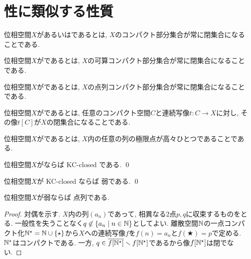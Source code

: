 \documentclass[uplatex, dvipdfmx, a4paper, 12pt, class=jsbook, crop=false]{standalone}
\begin{document}
\section{\Hausdorff 性に類似する性質}
\label{sec:Hausdorff-like-properties}

\begin{definition}
	位相空間$ X $があるいはであるとは, $ X $のコンパクト部分集合が常に閉集合になることである.
\end{definition}

\begin{definition}
	位相空間$ X $がであるとは, $ X $の可算コンパクト部分集合が常に閉集合になることである.
\end{definition}

\begin{definition}
	位相空間$ X $がであるとは, $ X $の点列コンパクト部分集合が常に閉集合になることである.
\end{definition}

\begin{definition}
	位相空間$ X $がであるとは, 任意のコンパクト\Hausdorff 空間$ C $と連続写像$ t \colon C \rightarrow X $に対し, その像$ t[C] $が$ X $の閉集合になることである.
\end{definition}

\begin{definition}
	位相空間$ X $がであるとは, $ X $内の任意の列の極限点が高々ひとつであることである.
\end{definition}

\begin{proposition}
	\label{whaus00001}
	位相空間$X$が\Hausdorff ならば KC-closed である.
	\qed
\end{proposition}

\begin{proposition}
	位相空間$X$が KC-closed ならば 弱\Hausdorff である.
	\qed
\end{proposition}

\begin{proposition}
	位相空間$X$が弱\Hausdorff ならば 点列\Hausdorff である.
\end{proposition}

\begin{proof}
	対偶を示す.
	$X$内の列$(a_n)$であって, 相異なる2点$p, q$に収束するものをとる.
	一般性を失うことなく$q \not\in \setcomp{a_n}{n \in \N}$としてよい.
	離散空間$\mathbb{N}$の一点コンパクト化$\mathbb{N}^\star = \mathbb{N} \cup \{\star\}$から$X$への連続写像$f$を$f(n) = a_n$と$f(\bigstar) = p$で定める.
	$\mathbb{N}^\star$はコンパクト\Hausdorff である.
	一方, $q \in \overline{f[\mathbb{N}^\star]} \smallsetminus f[\mathbb{N}^\star]$であるから像$f[\mathbb{N}^\star]$は閉でない.
\end{proof}
\end{document}
